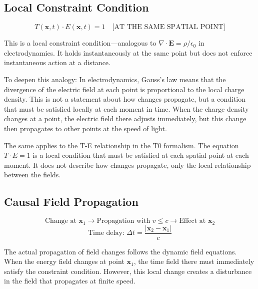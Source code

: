 	\subsection{Local Constraint Condition}
	
	\begin{equation}
		T(\mathbf{x},t) \cdot E(\mathbf{x},t) = 1 \quad \text{[AT THE SAME SPATIAL POINT]} \label{eq:local_constraint}
	\end{equation}
	
	This is a local constraint condition—analogous to $\nabla \cdot \mathbf{E} = \rho/\epsilon_0$ in electrodynamics. It holds instantaneously at the same point but does not enforce instantaneous action at a distance.
	
	To deepen this analogy: In electrodynamics, Gauss's law means that the divergence of the electric field at each point is proportional to the local charge density. This is not a statement about how changes propagate, but a condition that must be satisfied locally at each moment in time. When the charge density changes at a point, the electric field there adjusts immediately, but this change then propagates to other points at the speed of light.
	
	The same applies to the T-E relationship in the T0 formalism. The equation $T \cdot E = 1$ is a local condition that must be satisfied at each spatial point at each moment. It does not describe how changes propagate, only the local relationship between the fields.
	
	\subsection{Causal Field Propagation}
	
	\begin{equation}
		\text{Change at } \mathbf{x}_1 \rightarrow \text{Propagation with } v \leq c \rightarrow \text{Effect at } \mathbf{x}_2
	\end{equation}
	\begin{equation}
		\text{Time delay: } \Delta t = \frac{|\mathbf{x}_2 - \mathbf{x}_1|}{c} \label{eq:time_delay}
	\end{equation}
	
	The actual propagation of field changes follows the dynamic field equations. When the energy field changes at point $\mathbf{x}_1$, the time field there must immediately satisfy the constraint condition. However, this local change creates a disturbance in the field that propagates at finite speed.
	
